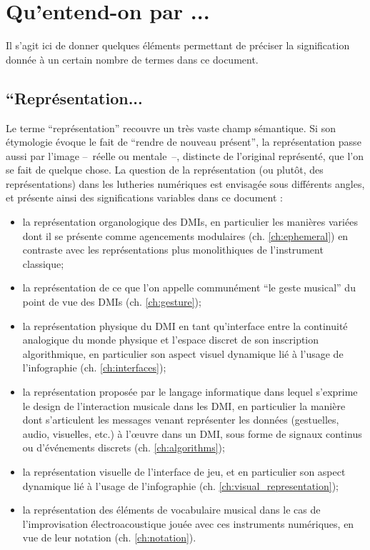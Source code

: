 \section{Qu'entend-on par ...}

\noindent Il s'agit ici de donner quelques éléments permettant de préciser la signification donnée à un certain nombre de termes dans ce document.

\subsection*{``Représentation...}

\noindent Le terme ``représentation'' recouvre un très vaste champ sémantique. Si son étymologie évoque le fait de ``rendre de nouveau présent'', la représentation passe aussi par l'image --~réelle ou mentale~--, distincte de l'original représenté, que l'on se fait de quelque chose. La question de la représentation (ou plutôt, des représentations) dans les lutheries numériques est envisagée sous différents angles, et présente ainsi des significations variables dans ce document : 
\vspace{-1em}
\begin{itemize}[noitemsep]
\item la représentation organologique des \glspl{DMI}, en particulier les manières variées dont il se présente comme agencements modulaires (ch. \ref{ch:ephemeral}) en contraste avec les représentations plus monolithiques de l'instrument classique;
\item la représentation de ce que l'on appelle communément ``le geste musical'' du point de vue des \glspl{DMI} (ch. \ref{ch:gesture});
\item la représentation physique du \gls{DMI} en tant qu'interface entre la continuité analogique du monde physique et l'espace discret de son inscription algorithmique, en particulier son aspect visuel dynamique lié à l'usage de l'infographie (ch. \ref{ch:interfaces});
\item la représentation proposée par le langage informatique dans lequel s'exprime le design de l'interaction musicale dans les \gls{DMI}, en particulier la manière dont s'articulent les messages venant représenter les données (gestuelles, audio, visuelles, etc.) à l'œuvre dans un \gls{DMI}, sous forme de signaux continus ou d'événements discrets (ch. \ref{ch:algorithms});
\item la représentation visuelle de l'interface de jeu, et en particulier son aspect dynamique lié à l'usage de l'infographie (ch. \ref{ch:visual_representation});
\item la représentation des éléments de vocabulaire musical dans le cas de l'improvisation électroacoustique jouée avec ces instruments numériques, en vue de leur notation (ch. \ref{ch:notation}).
\end{itemize}


